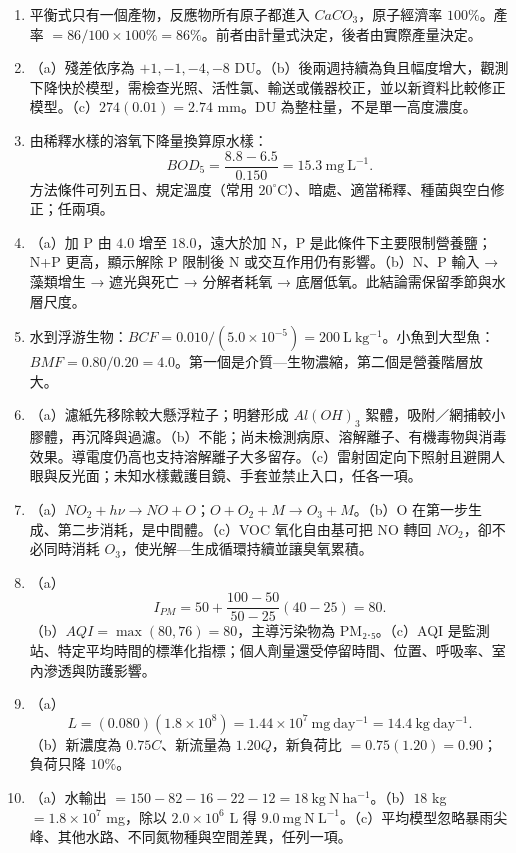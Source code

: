 \documentclass[11pt,a4paper]{article}
\begin{document}
\begin{enumerate}
\def\labelenumi{\arabic{enumi}.}
\item
  平衡式只有一個產物，反應物所有原子都進入 \(CaCO_3\)，原子經濟率 \(100\%\)。產率 \(=86/100\times100\%=86\%\)。前者由計量式決定，後者由實際產量決定。
\item
  （a）殘差依序為 \(+1,-1,-4,-8\) DU。（b）後兩週持續為負且幅度增大，觀測下降快於模型，需檢查光照、活性氯、輸送或儀器校正，並以新資料比較修正模型。（c）\(274(0.01)=2.74\) mm。DU 為整柱量，不是單一高度濃度。
\item
  由稀釋水樣的溶氧下降量換算原水樣：
  \[
  BOD_5=\frac{8.8-6.5}{0.150}=15.3\ \mathrm{mg\ L^{-1}}.
  \]
  方法條件可列五日、規定溫度（常用 \(20^\circ\mathrm C\)）、暗處、適當稀釋、種菌與空白修正；任兩項。
\item
  （a）加 P 由 \(4.0\) 增至 \(18.0\)，遠大於加 N，P 是此條件下主要限制營養鹽；N+P 更高，顯示解除 P 限制後 N 或交互作用仍有影響。（b）N、P 輸入 → 藻類增生 → 遮光與死亡 → 分解者耗氧 → 底層低氧。此結論需保留季節與水層尺度。
\item
  水到浮游生物：\(BCF=0.010/(5.0\times10^{-5})=200\ \mathrm{L\ kg^{-1}}\)。小魚到大型魚：\(BMF=0.80/0.20=4.0\)。第一個是介質---生物濃縮，第二個是營養階層放大。
\item
  （a）濾紙先移除較大懸浮粒子；明礬形成 \(Al(OH)_3\) 絮體，吸附／網捕較小膠體，再沉降與過濾。（b）不能；尚未檢測病原、溶解離子、有機毒物與消毒效果。導電度仍高也支持溶解離子大多留存。（c）雷射固定向下照射且避開人眼與反光面；未知水樣戴護目鏡、手套並禁止入口，任各一項。
\item
  （a）\(NO_2+h\nu\rightarrow NO+O\)；\(O+O_2+M\rightarrow O_3+M\)。（b）O 在第一步生成、第二步消耗，是中間體。（c）VOC 氧化自由基可把 NO 轉回 \(NO_2\)，卻不必同時消耗 \(O_3\)，使光解---生成循環持續並讓臭氧累積。
\item
  （a）
  \[
  I_{PM}=50+\frac{100-50}{50-25}(40-25)=80.
  \]
  （b）\(AQI=\max(80,76)=80\)，主導污染物為 PM₂.₅。（c）AQI 是監測站、特定平均時間的標準化指標；個人劑量還受停留時間、位置、呼吸率、室內滲透與防護影響。
\item
  （a）
  \[
  L=(0.080)(1.8\times10^8)=1.44\times10^7\ \mathrm{mg\ day^{-1}}
  =14.4\ \mathrm{kg\ day^{-1}}.
  \]
  （b）新濃度為 \(0.75C\)、新流量為 \(1.20Q\)，新負荷比 \(=0.75(1.20)=0.90\)；負荷只降 \(10\%\)。
\item
  （a）水輸出 \(=150-82-16-22-12=18\ \mathrm{kg\ N\ ha^{-1}}\)。（b）\(18\) kg \(=1.8\times10^7\) mg，除以 \(2.0\times10^6\) L 得 \(9.0\ \mathrm{mg\ N\ L^{-1}}\)。（c）平均模型忽略暴雨尖峰、其他水路、不同氮物種與空間差異，任列一項。

\end{enumerate}
\end{document}
